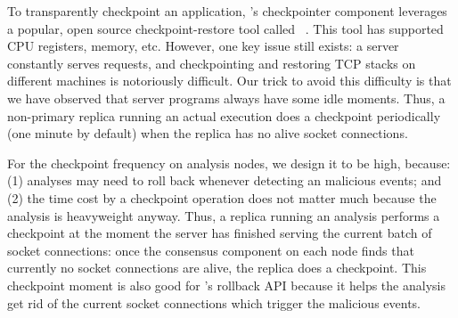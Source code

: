 To transparently checkpoint an application, \xxx's checkpointer component 
leverages a popular, open source checkpoint-restore tool called 
\criu~\cite{criu}. This tool has supported CPU registers, memory, etc. However, 
one key issue still exists: a server constantly serves requests, and 
checkpointing and restoring TCP stacks on different machines is notoriously 
difficult. Our trick to avoid this difficulty is that we have observed that 
server programs always have some idle moments. Thus, a \xxx non-primary replica 
running an actual execution does a checkpoint periodically (one minute by 
default) when the replica has no alive socket connections.

For the checkpoint frequency on analysis nodes, we design it to be high, 
because: (1) analyses may need to roll back whenever detecting an malicious 
events; and (2) the time cost by a checkpoint operation does not matter much 
because the analysis is heavyweight anyway. Thus, a \xxx replica running an 
analysis performs a checkpoint at the moment the server has finished serving 
the current batch of socket connections: once the \paxos consensus component on 
each node finds that currently no socket connections are alive, the replica 
does a checkpoint. This checkpoint moment is also good for \xxx's rollback API 
because it helps the analysis get rid of the current socket connections which 
trigger the malicious events. 


